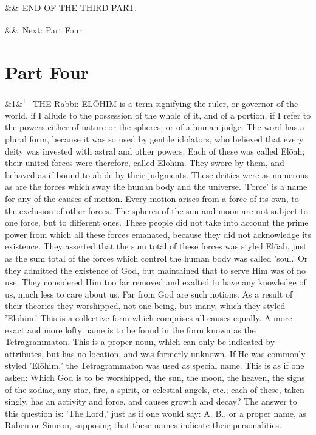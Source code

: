 \documentclass[12pt]{article}
\newcommand{\para}[1][]{\par\noindent\ifx&#1&\else\textsuperscript{\footnotesize #1}~\fi}
\begin{document}
\para END OF THE THIRD PART.

\para Next: Part Four

\section*{Part Four}

\para[1] THE Rabbi: ELŌHIM is a term signifying the ruler, or governor of the world, if I allude to the possession of the whole of it, and of a portion, if I refer to the powers either of nature or the spheres, or of a human judge. The word has a plural form, because it was so used by gentile idolators, who believed that every deity was invested with astral and other powers. Each of these was called Elōah; their united forces were therefore, called Elōhim. They swore by them, and behaved as if bound to abide by their judgments. These deities were as numerous as are the forces which sway the human body and the universe. 'Force' is a name for any of the causes of motion. Every motion arises from a force of its own, to the exclusion of other forces. The spheres of the sun and moon are not subject to one force, but to different ones. These people did not take into account the prime power from which all these forces emanated, because they did not acknowledge its existence. They asserted that the sum total of these forces was styled Elōah, just as the sum total of the forces which control the human body was called 'soul.' Or they admitted the existence of God, but maintained that to serve Him was of no use. They considered Him too far removed and exalted to have any knowledge of us, much less to care about us. Far from God are such notions. As a result of their theories they worshipped, not one being, but many, which they styled 'Elōhim.' This is a collective form which comprises all causes equally. A more exact and more lofty name is to be found in the form known as the Tetragrammaton. This is a proper noun, which can only be indicated by attributes, but has no location, and was formerly unknown. If He was commonly styled 'Elōhim,' the Tetragrammaton was used as special name. This is as if one asked: Which God is to be worshipped, the sun, the moon, the heaven, the signs of the zodiac, any star, fire, a spirit, or celestial angels, etc.; each of these, taken singly, has an activity and force, and causes growth and decay? The answer to this question is: 'The Lord,' just as if one would say: A. B., or a proper name, as Ruben or Simeon, supposing that these names indicate their personalities.
\end{document}

